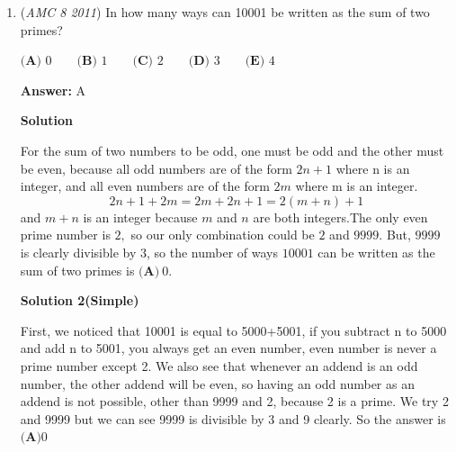 \begin{enumerate}
We can separate this into two cases. If an integer is a multiple of $5,$ the last digit must be either $0$ or $5.$

 Case 1: The last digit is $5.$ The leading digit can be $1,2,3,$ or $4.$ Because the second digit can be $0$ but not the leading digit, there are also $4$ choices. The third digit cannot be the leading digit or the second digit, so there are $3$ choices. The number of integers is this case is $4\cdot4\cdot3\cdot1=48.$

 Case 2: The last digit is $0.$ Because $5$ is the largest digit, one of the remaining three digits must be $5.$ There are $3$ ways to choose which digit should be $5.$ The remaining digits can be $1,2,3,$ or $4,$ but since they have to be different there are $4\cdot3$ ways to choose. The number of integers in this case is $1\cdot3\cdot4\cdot3=36.$

 Therefore, the answer is $48+36=\boxed{\textbf{(D)}\ 84}$.

 


	\item (\textit{AMC 8 2011}) In how many ways can 10001 be written as the sum of two primes?


 $\textbf{(A) }0\qquad\textbf{(B) }1\qquad\textbf{(C) }2\qquad\textbf{(D) }3\qquad\textbf{(E) }4$

 \textbf{Answer: }A



\textbf{Solution}

For the sum of two numbers to be odd, one must be odd and the other must be even, because all odd numbers are of the form $2n+1$ where n is an integer, and all even numbers are of the form $2m$ where m is an integer.
 \[2n + 1 + 2m = 2m + 2n + 1 = 2(m+n) + 1\] and $m+n$ is an integer because $m$ and $n$ are both integers.The only even prime number is $2,$ so our only combination could be $2$ and $9999.$ But, $9999$ is clearly divisible by $3$,  so the number of ways $10001$ can be written as the sum of two primes is $\boxed{\textbf{(A)}\ 0}$.

 



\textbf{Solution 2(Simple)}

First, we noticed that 10001 is equal to 5000+5001, if you subtract n to 5000 and add n to 5001, you always get an even number, even number is never a prime number except 2. We also see that whenever an addend is an odd number, the other addend will be even, so having an odd number as an addend is not possible, other than 9999 and 2, because 2 is a prime. We try 2 and 9999 but we can see 9999 is divisible by 3 and 9 clearly. So the answer is $\boxed{\textbf{(A)} 0}$





\end{enumerate}
